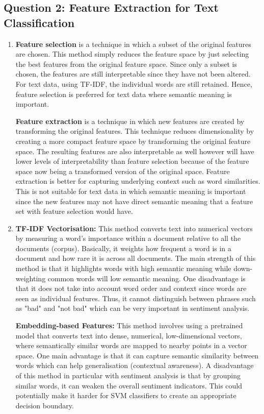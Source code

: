 \subsection{Question 2: Feature Extraction for Text Classification}

\begin{enumerate}[label=\textbf{(\alph*)}, leftmargin=*, align=left]
    \item \textbf{Feature selection} is a technique in which a subset of the original features are chosen. This method simply reduces the feature space by just selecting the best features from
          the original feature space. Since only a subset is chosen, the features are still interpretable since they have not been altered. For text data, using
          TF-IDF, the individual words are still retained. Hence, feature selection is preferred for text data where semantic meaning is important.

          \textbf{Feature extraction} is a technique in which new features are created by transforming the original features. This technique reduces dimensionality by creating a more compact 
          feature space by transforming the original feature space. The resulting features are also interpretable as well however will have lower levels of 
          interpretability than feature selection because of the feature space now being a transformed version of the original space. Feature extraction is better for capturing underlying
          context such as word similarities. This is not suitable for text data in which semantic meaning is important since the new features may not have direct semantic meaning that a
          feature set with feature selection would have.
    
    \item \textbf{TF-IDF Vectorisation:} This method converts text into numerical vectors by measuring a word's importance within a document relative to all the documents (corpus). Basically,
          it weights how frequent a word is in a document and how rare it is across all documents. The main strength of this method is that it highlights words with high semantic
          meaning while down-weighting common words will low semantic meaning. One disadvantage is that it does not take into account word order and context since words are seen
          as individual features. Thus, it cannot distinguish between phrases such as "bad" and "not bad" which can be very important in sentiment analysis. 
    
          \textbf{Embedding-based Features:} This method involves using a pretrained model that converts text into dense, numerical, low-dimensional vectors, where semantically similar words
          are mapped to nearby points in a vector space. One main advantage is that it can capture semantic similarity between words which can help generalisation (contextual awareness).
          A disadvantage of this method in particular with sentiment analysis is that by grouping similar words, it can weaken the overall sentiment indicators. This could potentially
          make it harder for SVM classifiers to create an appropriate decision boundary.


\end{enumerate}
